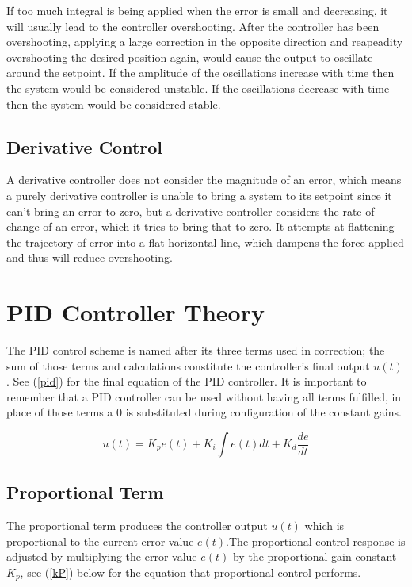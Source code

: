 \documentclass[10pt,conference]{IEEEtran}
\begin{document}
If too much integral is being applied when the error is small and decreasing, it will 
usually lead to the controller overshooting. After the controller has been 
overshooting, applying a large correction in the opposite direction and reapeadity 
overshooting the desired position again, would cause the output to oscillate around 
the setpoint. If the amplitude of the oscillations increase with time then the 
system would be considered unstable. If the oscillations decrease with time then 
the system would be considered stable.

\subsection{Derivative Control}

A derivative controller does not consider the magnitude of an error, which means 
a purely derivative controller is unable to bring a system to its setpoint since 
it can't bring an error to zero, but a derivative controller considers the rate 
of change of an error, which it tries to bring that to zero. It attempts at 
flattening the trajectory of error into a flat horizontal line, which dampens 
the force applied and thus will reduce overshooting.

\section{PID Controller Theory}

The PID control scheme is named after its three terms used in correction; the sum of those terms and
calculations constitute the controller's final output \(u(t)\). See (\ref{pid}) for the final equation of the
PID controller. It is important to remember that a PID controller can be used without having all terms
fulfilled, in place of those terms a 0 is substituted during configuration of the constant gains.

\begin{equation}
    \displaystyle {u(t)=K_pe(t)+K_i\int e(t)dt + K_d\frac{de}{dt}}\label{pid}
\end{equation}

\subsection{Proportional Term}

The proportional term produces the controller output \(u(t)\) which is proportional to the current
error value \(e(t)\).The proportional control response is adjusted by multiplying the error
value \(e(t)\) by the proportional gain constant \(K_p\), see (\ref{kP}) below for the equation that
proportional control performs.
\end{document}
